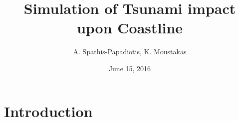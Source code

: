 \documentclass[8pt,sans,mathserif,aspectratio=43]{beamer}
\begin{document}
\title{Simulation of Tsunami impact upon Coastline}
\author{A. Spathis-Papadiotis, K. Moustakas}  \date{June 15, 2016}


\begin{frame}
  \titlepage
\end{frame}


\section{Introduction}
\end{document}

